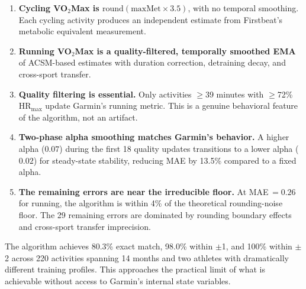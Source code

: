 \documentclass[11pt,a4paper]{article}
\begin{document}
\begin{enumerate}
    \item \textbf{Cycling VO$_2$Max is $\text{round}(\text{maxMet} \times 3.5)$}, with no temporal smoothing.
    Each cycling activity produces an independent estimate from Firstbeat's metabolic equivalent measurement.

    \item \textbf{Running VO$_2$Max is a quality-filtered, temporally smoothed EMA} of ACSM-based estimates with duration correction, detraining decay, and cross-sport transfer.

    \item \textbf{Quality filtering is essential.}
    Only activities $\geq$39 minutes with $\geq$72\% HR$_{\text{max}}$ update Garmin's running metric.
    This is a genuine behavioral feature of the algorithm, not an artifact.

    \item \textbf{Two-phase alpha smoothing matches Garmin's behavior.}
    A higher alpha ($0.07$) during the first 18 quality updates transitions to a lower alpha ($0.02$) for steady-state stability, reducing MAE by 13.5\% compared to a fixed alpha.

    \item \textbf{The remaining errors are near the irreducible floor.}
    At MAE\,$= 0.26$ for running, the algorithm is within 4\% of the theoretical rounding-noise floor.
    The 29 remaining errors are dominated by rounding boundary effects and cross-sport transfer imprecision.
\end{enumerate}

\vspace{0.5em}

The algorithm achieves 80.3\% exact match, 98.0\% within $\pm$1, and 100\% within $\pm$2 across 220 activities spanning 14 months and two athletes with dramatically different training profiles.
This approaches the practical limit of what is achievable without access to Garmin's internal state variables.
\end{document}
